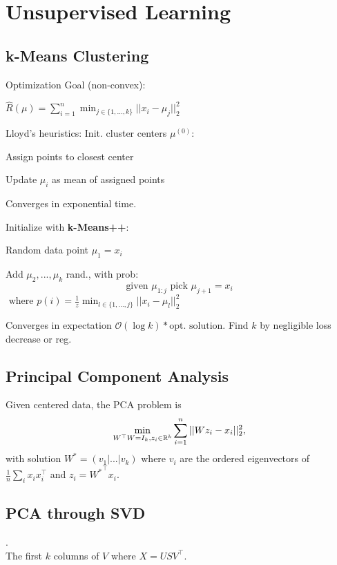 \section*{Unsupervised Learning}

\subsection*{k-Means Clustering}

Optimization Goal (non-convex):

\qquad $\hat{R} (\mu) = \sum_{i=1}^n \min_{j\in \{1,...,k\}} ||x_i - \mu_j||_2^2$

Lloyd's heuristics:
Init. cluster centers $\mu^{(0)}$:
\begin{compactitem}
	\item Assign points to closest center				
	\item Update $\mu_i$ as mean of assigned points
\end{compactitem}

Converges in exponential time.

Initialize with \textbf{k-Means++}:

\begin{compactitem}
	\item Random data point $\mu_1 = x_i$
	\item Add $\mu_2,...,\mu_k$ rand., with prob:
		$$\text{given } \mu_{1:j} \text{ pick } \mu_{j+1} = x_i$$ 
		$\text{ where } p(i) = \frac{1}{z} \min_{l \in \{1,...,j\}} ||x_i - \mu_l||_2^2$
\end{compactitem}
Converges in expectation $\mathcal O (\log k) * \text{opt. solution}$.
Find $k$ by negligible loss decrease or reg.

\subsection*{Principal Component Analysis}

Given centered data, the PCA problem is 
$$\min_{W^\top W=I_k,z_i\in\mathbb{R}^k}\sum_{i=1}^n||W z_i - x_i||_2^2,$$
with solution $W^* = (v_1|...|v_k)$ where $v_i$ are the ordered 
eigenvectors of $\frac{1}{n}\sum_ix_ix_i^\top$ 
and $z_i = {W^*}^\top x_i$. 

\subsection*{PCA through SVD}
\color{White} . \color {Black}\\[-10pt]
The first $k$ columns of $V$ where $X = U S V^\top$.

